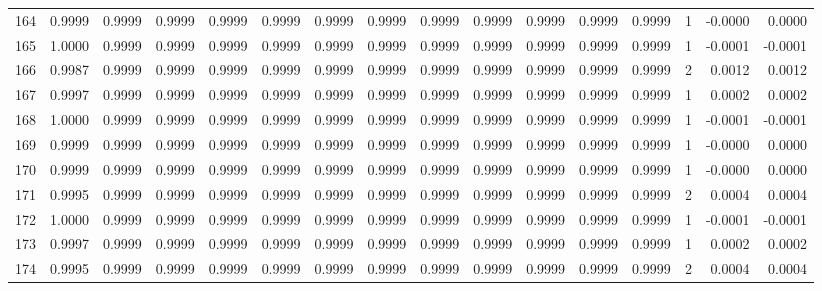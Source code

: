 \begin{tabular}{lrrrrrrrrrrrrrrr}
164 &      0.9999 &  0.9999 &  0.9999 &  0.9999 &  0.9999 &  0.9999 &  0.9999 &  0.9999 &  0.9999 &  0.9999 &   0.9999 &     0.9999 &      1 &                   -0.0000 &                     0.0000 \\
165 &      1.0000 &  0.9999 &  0.9999 &  0.9999 &  0.9999 &  0.9999 &  0.9999 &  0.9999 &  0.9999 &  0.9999 &   0.9999 &     0.9999 &      1 &                   -0.0001 &                    -0.0001 \\
166 &      0.9987 &  0.9999 &  0.9999 &  0.9999 &  0.9999 &  0.9999 &  0.9999 &  0.9999 &  0.9999 &  0.9999 &   0.9999 &     0.9999 &      2 &                    0.0012 &                     0.0012 \\
167 &      0.9997 &  0.9999 &  0.9999 &  0.9999 &  0.9999 &  0.9999 &  0.9999 &  0.9999 &  0.9999 &  0.9999 &   0.9999 &     0.9999 &      1 &                    0.0002 &                     0.0002 \\
168 &      1.0000 &  0.9999 &  0.9999 &  0.9999 &  0.9999 &  0.9999 &  0.9999 &  0.9999 &  0.9999 &  0.9999 &   0.9999 &     0.9999 &      1 &                   -0.0001 &                    -0.0001 \\
169 &      0.9999 &  0.9999 &  0.9999 &  0.9999 &  0.9999 &  0.9999 &  0.9999 &  0.9999 &  0.9999 &  0.9999 &   0.9999 &     0.9999 &      1 &                   -0.0000 &                     0.0000 \\
170 &      0.9999 &  0.9999 &  0.9999 &  0.9999 &  0.9999 &  0.9999 &  0.9999 &  0.9999 &  0.9999 &  0.9999 &   0.9999 &     0.9999 &      1 &                   -0.0000 &                     0.0000 \\
171 &      0.9995 &  0.9999 &  0.9999 &  0.9999 &  0.9999 &  0.9999 &  0.9999 &  0.9999 &  0.9999 &  0.9999 &   0.9999 &     0.9999 &      2 &                    0.0004 &                     0.0004 \\
172 &      1.0000 &  0.9999 &  0.9999 &  0.9999 &  0.9999 &  0.9999 &  0.9999 &  0.9999 &  0.9999 &  0.9999 &   0.9999 &     0.9999 &      1 &                   -0.0001 &                    -0.0001 \\
173 &      0.9997 &  0.9999 &  0.9999 &  0.9999 &  0.9999 &  0.9999 &  0.9999 &  0.9999 &  0.9999 &  0.9999 &   0.9999 &     0.9999 &      1 &                    0.0002 &                     0.0002 \\
174 &      0.9995 &  0.9999 &  0.9999 &  0.9999 &  0.9999 &  0.9999 &  0.9999 &  0.9999 &  0.9999 &  0.9999 &   0.9999 &     0.9999 &      2 &                    0.0004 &                     0.0004 \\

\end{tabular}
